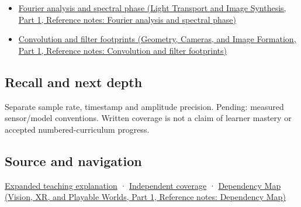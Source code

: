 \hypertarget{appendix-1077ea8fc737-used-by}{}

\begin{itemize}
\tightlist
\item
  \href{../04-Light-Transport-and-Image-Synthesis-P01/main.pdf\#nameddest=appendix-b60686ba06a1}{Fourier analysis and spectral phase (Light Transport and Image Synthesis, Part 1, Reference notes: Fourier analysis and spectral phase)}
\item
  \href{../03-Geometry-Cameras-and-Image-Formation-P01/main.pdf\#nameddest=appendix-d5b3c692d9f0}{Convolution and filter footprints (Geometry, Cameras, and Image Formation, Part 1, Reference notes: Convolution and filter footprints)}
\end{itemize}

\subsection{Recall and next depth}\label{appendix-1077ea8fc737-recall-and-next-depth}

\hypertarget{appendix-1077ea8fc737-recall-and-next-depth}{}

Separate sample rate, timestamp and amplitude precision. Pending: measured sensor/model conventions. Written coverage is not a claim of learner mastery or accepted numbered-curriculum progress.

\subsection{Source and navigation}\label{appendix-1077ea8fc737-source-and-navigation}

\hypertarget{appendix-1077ea8fc737-source-and-navigation}{}

\hyperref[04-visual-computing-ii-ch042-sampling-is-a-question-of-what-remains-distinguishable]{Expanded teaching explanation} · \hyperref[appendix-fd090d982a15-xr01---independent-seeing-and-representation-source]{Independent coverage} · \href{../07-Vision-XR-and-Playable-Worlds-P01/main.pdf\#nameddest=appendix-4ad47bdd269a}{Dependency Map (Vision, XR, and Playable Worlds, Part 1, Reference notes: Dependency Map)}
